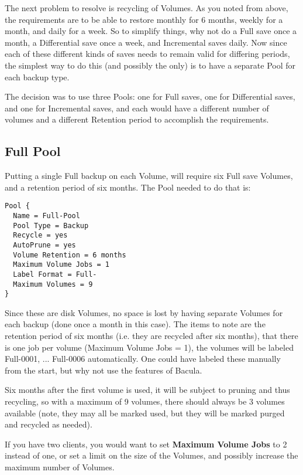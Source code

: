 The next problem to resolve is recycling of Volumes. As you noted from above,
the requirements are to be able to restore monthly for 6 months, weekly for a
month, and daily for a week. So to simplify things, why not do a Full save
once a month, a Differential save once a week, and Incremental saves daily.
Now since each of these different kinds of saves needs to remain valid for
differing periods, the simplest way to do this (and possibly the only) is to
have a separate Pool for each backup type. 

The decision was to use three Pools: one for Full saves, one for Differential
saves, and one for Incremental saves, and each would have a different number
of volumes and a different Retention period to accomplish the requirements. 

\label{FullPool}
\subsection{Full Pool}

Putting a single Full backup on each Volume, will require six Full save
Volumes, and a retention period of six months. The Pool needed to do that is: 

\footnotesize
\begin{verbatim}
Pool {
  Name = Full-Pool
  Pool Type = Backup
  Recycle = yes
  AutoPrune = yes
  Volume Retention = 6 months
  Maximum Volume Jobs = 1
  Label Format = Full-
  Maximum Volumes = 9
}
\end{verbatim}
\normalsize

Since these are disk Volumes, no space is lost by having separate Volumes for
each backup (done once a month in this case). The items to note are the
retention period of six months (i.e. they are recycled after six months), that
there is one job per volume (Maximum Volume Jobs = 1), the volumes will be
labeled Full-0001, ... Full-0006 automatically. One could have labeled these
manually from the start, but why not use the features of Bacula. 

Six months after the first volume is used, it will be subject to pruning
and thus recycling, so with a maximum of 9 volumes, there should always be
3 volumes available (note, they may all be marked used, but they will be
marked purged and recycled as needed).

If you have two clients, you would want to set {\bf Maximum Volume Jobs} to
2 instead of one, or set a limit on the size of the Volumes, and possibly 
increase the maximum number of Volumes.


